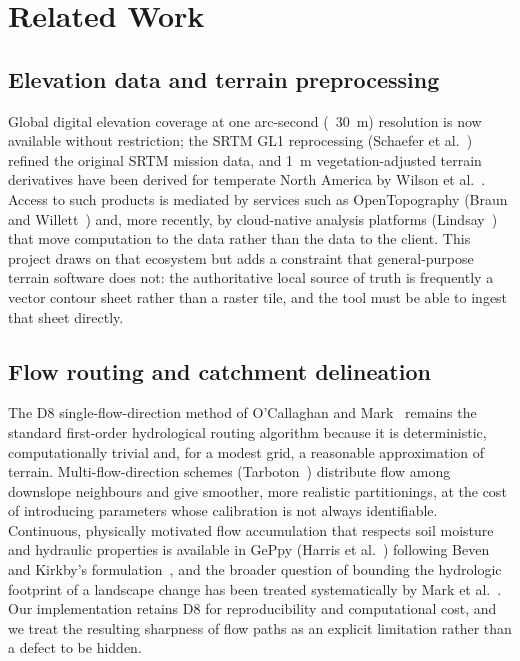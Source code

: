 \documentclass[sigconf,review,10pt]{acmart}
\begin{document}
\section{Related Work}
\label{sec:related}

\subsection{Elevation data and terrain preprocessing}

Global digital elevation coverage at one arc-second (~30~m) resolution is
now available without restriction; the SRTM GL1 reprocessing
(Schaefer et al.~\cite{schaefer2016}) refined the original SRTM
mission data, and 1~m vegetation-adjusted terrain derivatives have been
derived for temperate North America by Wilson et al.~\cite{wilson2018}.
Access to such products is mediated by services such as OpenTopography
(Braun and Willett~\cite{braun2010}) and, more recently, by cloud-native
analysis platforms (Lindsay~\cite{lindsay2016}) that move computation to
the data rather than the data to the client. This project draws on that
ecosystem but adds a constraint that general-purpose terrain software does
not: the authoritative local source of truth is frequently a vector
contour sheet rather than a raster tile, and the tool must be able to
ingest that sheet directly.

\subsection{Flow routing and catchment delineation}

The D8 single-flow-direction method of O'Callaghan and Mark~\cite{ocallaghan1984}
remains the standard first-order hydrological routing algorithm because it
is deterministic, computationally trivial and, for a modest grid, a
reasonable approximation of terrain. Multi-flow-direction schemes
(Tarboton~\cite{tarboton1997}) distribute flow among downslope
neighbours and give smoother, more realistic partitionings, at the cost of
introducing parameters whose calibration is not always identifiable.
Continuous, physically motivated flow accumulation that respects soil
moisture and hydraulic properties is available in
GePpy (Harris et al.~\cite{harris2020}) following Beven and Kirkby's
formulation~\cite{beven1979}, and the broader question of bounding the
hydrologic footprint of a landscape change has been treated
systematically by Mark et al.~\cite{mark2006}. Our implementation retains
D8 for reproducibility and computational cost, and we treat the resulting
sharpness of flow paths as an explicit limitation rather than a defect to
be hidden.
\end{document}
